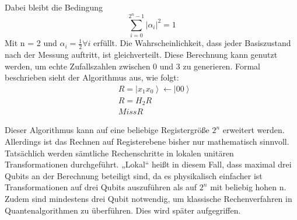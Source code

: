Dabei bleibt die Bedingung 
\begin{equation}
    \sum_{i=0}^{2^n-1}\left|\alpha_i\right|^2=1
\end{equation}
 Mit n = 2 und $\alpha_i=\frac{1}{2}\forall i$ erfüllt. Die Wahrscheinlichkeit, dass jeder Basiszustand nach der Messung auftritt, ist gleichverteilt. Diese Berechnung kann genutzt werden, um echte Zufallszahlen zwischen 0 und 3 zu generieren. Formal beschrieben sieht der Algorithmus aus, wie folgt:
 \begin{align*}
     &R=\left|\left.x_1x_0\right\rangle\right.\gets\left|\left.00\right\rangle\right.\\
	&R=H_2R\\
	&Miss R
 \end{align*}

Dieser Algorithmus kann auf eine beliebige Registergröße $2^n$ erweitert werden. 
Allerdings ist das Rechnen auf Registerebene bisher nur mathematisch sinnvoll. Tatsächlich werden sämtliche Rechenschritte in lokalen unitären Transformationen durchgeführt. „Lokal“ heißt in diesem Fall, dass maximal drei Qubits an der Berechnung beteiligt sind, da es physikalisch einfacher ist Transformationen auf drei Qubits auszuführen als auf $2^n$ mit beliebig hohen n. Zudem sind mindestens drei Qubit notwendig, um klassische Rechenverfahren in Quantenalgorithmen zu überführen. Dies wird später aufgegriffen.\\

